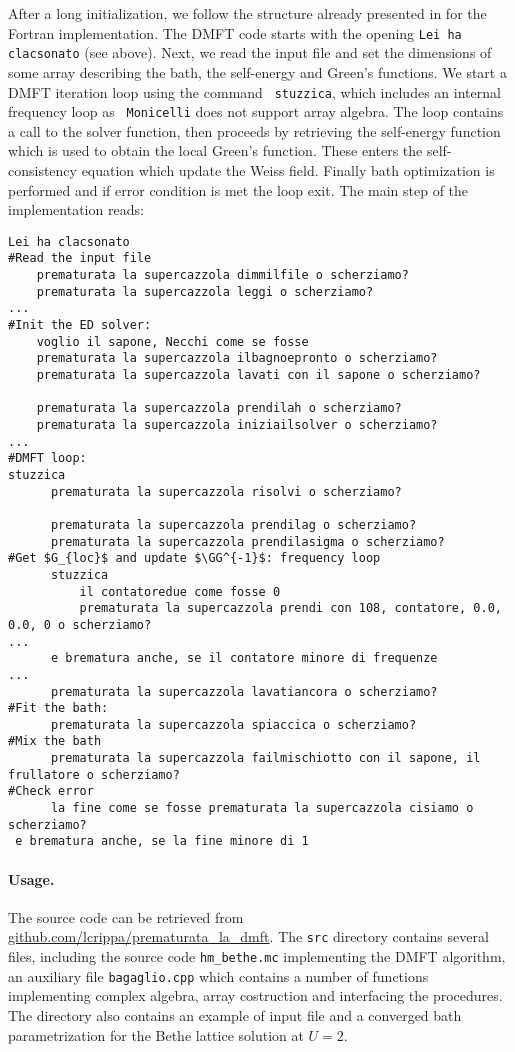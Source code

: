 \documentclass[edipack_sp.tex]{subfiles}
\begin{document}
After a long initialization, we follow the structure already presented
in  for the Fortran implementation.
The DMFT code starts with the opening {\tt Lei ha clacsonato} (see
above). Next, we read the input file and set the dimensions of some
array describing the bath, the self-energy and Green's
functions. We start a DMFT iteration loop using the command {\tt
  stuzzica}, which includes an internal frequency loop as {\tt
  Monicelli} does not support array algebra.
The loop contains a call to the \NAME solver function, then proceeds
by retrieving the self-energy function which is used to obtain the
local Green's function. These enters the self-consistency equation
which update the Weiss field. Finally bath optimization is performed
and if error condition is met the loop exit.
The main step of the implementation reads: 


\begin{lstlisting}[style=cstyle]
Lei ha clacsonato
#Read the input file
    prematurata la supercazzola dimmilfile o scherziamo?
    prematurata la supercazzola leggi o scherziamo? 
...                                                  
#Init the ED solver:
    voglio il sapone, Necchi come se fosse
    prematurata la supercazzola ilbagnoepronto o scherziamo?
    prematurata la supercazzola lavati con il sapone o scherziamo?
        
    prematurata la supercazzola prendilah o scherziamo?
    prematurata la supercazzola iniziailsolver o scherziamo?
...
#DMFT loop:
stuzzica    
      prematurata la supercazzola risolvi o scherziamo?
      
      prematurata la supercazzola prendilag o scherziamo?
      prematurata la supercazzola prendilasigma o scherziamo?
#Get $G_{loc}$ and update $\GG^{-1}$: frequency loop
      stuzzica                   
          il contatoredue come fosse 0
          prematurata la supercazzola prendi con 108, contatore, 0.0, 0.0, 0 o scherziamo?
...
      e brematura anche, se il contatore minore di frequenze
...      
      prematurata la supercazzola lavatiancora o scherziamo?
#Fit the bath:       
      prematurata la supercazzola spiaccica o scherziamo?
#Mix the bath           
      prematurata la supercazzola failmischiotto con il sapone, il frullatore o scherziamo?
#Check error      
      la fine come se fosse prematurata la supercazzola cisiamo o scherziamo?         
 e brematura anche, se la fine minore di 1
\end{lstlisting}

\paragraph{Usage.}
The source code can be retrieved from
\href{https://github.com/lcrippa/prematurata_la_dmft}{github.com/lcrippa/prematurata\_la\_dmft}. 
The {\tt src} directory contains several files, including the source
code {\tt hm\_bethe.mc} implementing the DMFT algorithm, an auxiliary file {\tt bagaglio.cpp} which
contains a number of functions implementing complex algebra, array
costruction and interfacing the \NAME procedures. The directory also
contains an example of input file and a converged bath parametrization
for the Bethe lattice solution at $U=2$.
\end{document}
